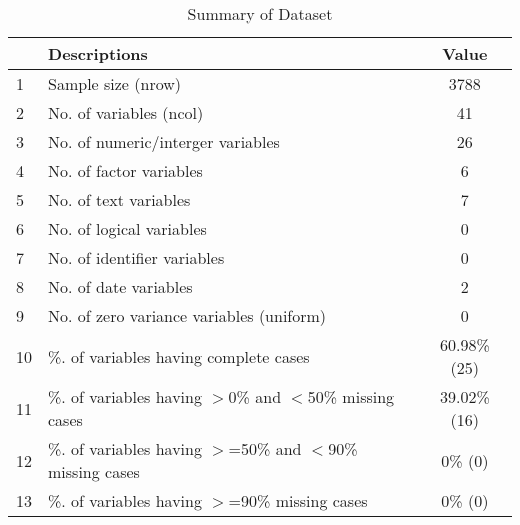 \begin{table}[ht]
\centering
\caption{Summary of Dataset} 
\begin{tabular}{llc}
  \hline
 & Descriptions & Value \\ 
  \hline
1 & Sample size (nrow) & 3788 \\ 
  2 & No. of variables (ncol) & 41 \\ 
  3 & No. of numeric/interger variables & 26 \\ 
  4 & No. of factor variables & 6 \\ 
  5 & No. of text variables & 7 \\ 
  6 & No. of logical variables & 0 \\ 
  7 & No. of identifier variables & 0 \\ 
  8 & No. of date variables & 2 \\ 
  9 & No. of zero variance variables (uniform) & 0 \\ 
  10 & \%. of variables having complete cases & 60.98\% (25) \\ 
  11 & \%. of variables having $>$0\% and $<$50\% missing cases & 39.02\% (16) \\ 
  12 & \%. of variables having $>$=50\% and $<$90\% missing cases & 0\% (0) \\ 
  13 & \%. of variables having $>$=90\% missing cases & 0\% (0) \\ 
   \hline
\end{tabular}
\end{table}
